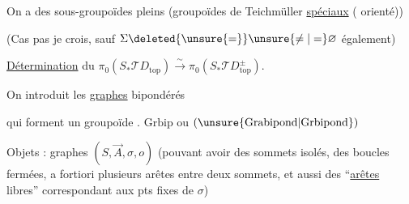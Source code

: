 On a des sous-groupoïdes pleins
(groupoïdes de Teichmüller \uline{spéciaux}  ( orienté))

(Cas pas  je crois, sauf  $\Sigma\deleted{\unsure{=}}\unsure{\ne|=}\varnothing$ également)

 \uline{Détermination} du $\pi_{0}(S_{*}\mathscr{T}D_{\mathrm{top}})\xrightarrow{\sim}\pi_{0}(S_{*}\mathscr{T}D_{\mathrm{top}}^{\pm})$.

On introduit les \uline{graphes}  bipondérés

qui forment un groupoïde . $\mathrm{Grbip}$ ou $(\unsure{\mathrm{Grabipond}|\mathrm{Grbipond}})$

Objets : graphes  $(S,\vec A,\sigma,o)$  (pouvant avoir des sommets isolés, des boucles fermées, a fortiori plusieurs arêtes entre deux sommets, et aussi des ``\uline{arêtes} libres'' correspondant aux pts fixes de $\sigma$)


